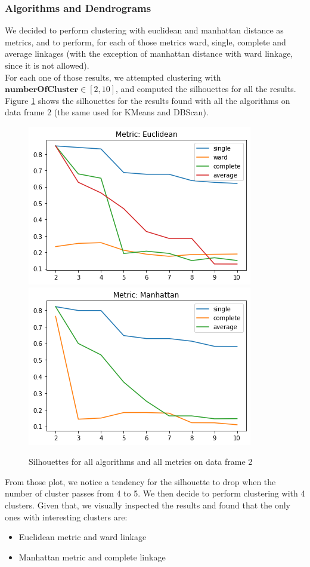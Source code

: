 \documentclass{article}
\begin{document}
\subsubsection{Algorithms and Dendrograms}
\label{sec:hier}
We decided to perform clustering with euclidean and manhattan distance as metrics, and to perform, for each of those metrics ward, single, complete and average linkages (with the exception of manhattan distance with ward linkage, since it is not allowed).\\
For each one of those results, we attempted clustering with $\mathbf{numberOfCluster} \in [2, 10]$, and computed the silhouettes for all the results.
Figure \ref{fig:silu} shows the silhouettes for the results found with all the algorithms on data frame 2 (the same used for KMeans and DBScan).
\begin{figure}[H]
\centering
\includegraphics[width=.49\textwidth]{silueuc}\hfill
\includegraphics[width=.49\textwidth]{siluman.png}\hfill
\caption{Silhouettes for all algorithms and all metrics on data frame 2}
\label{fig:silu}
\end{figure}
From those plot, we notice a tendency for the silhouette to drop when the number of cluster passes from 4 to 5. We then decide to perform clustering with 4 clusters.
Given that, we visually inspected the results and found that the only ones with interesting clusters are:
\begin{itemize}
    \item Euclidean metric and ward linkage
    \item Manhattan metric and complete linkage
\end{itemize}
\end{document}

